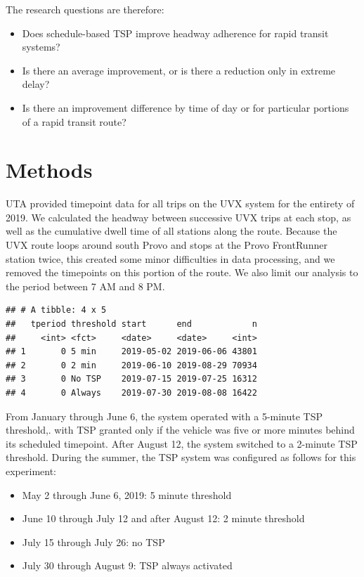 \documentclass[3p, authoryear, review]{elsarticle} %
\providecommand{\tightlist}{%
  \setlength{\itemsep}{0pt}\setlength{\parskip}{0pt}}
\begin{document}
The research questions are therefore:

\begin{itemize}
\tightlist
\item
  Does schedule-based TSP improve headway adherence for rapid transit systems?
\item
  Is there an average improvement, or is there a reduction only in extreme delay?
\item
  Is there an improvement difference by time of day or for particular portions of
  a rapid transit route?
\end{itemize}

\hypertarget{methods}{%
\section{Methods}\label{methods}}

UTA provided timepoint data for all trips on the UVX system for the entirety of
2019. We calculated the headway between successive UVX trips at each stop, as
well as the cumulative dwell time of all stations along the route. Because the
UVX route loops around south Provo and stops at the Provo FrontRunner station
twice, this created some minor difficulties in data processing, and we removed
the timepoints on this portion of the route. We also limit our analysis to the
period between 7 AM and 8 PM.

\begin{verbatim}
## # A tibble: 4 x 5
##   tperiod threshold start      end            n
##     <int> <fct>     <date>     <date>     <int>
## 1       0 5 min     2019-05-02 2019-06-06 43801
## 2       0 2 min     2019-06-10 2019-08-29 70934
## 3       0 No TSP    2019-07-15 2019-07-25 16312
## 4       0 Always    2019-07-30 2019-08-08 16422
\end{verbatim}

From January through June 6, the system operated with a 5-minute TSP threshold,.
with TSP granted only if the vehicle was five or more minutes behind its
scheduled timepoint. After August 12, the system switched to a 2-minute TSP
threshold. During the summer, the TSP system was configured as follows for this
experiment:

\begin{itemize}
\tightlist
\item
  May 2 through June 6, 2019: 5 minute threshold
\item
  June 10 through July 12 and after August 12: 2 minute threshold
\item
  July 15 through July 26: no TSP
\item
  July 30 through August 9: TSP always activated
\end{itemize}
\end{document}
